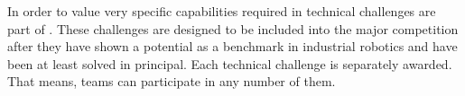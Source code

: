 
In order to value very specific capabilities required in \RCAW technical challenges are part of \RCAW.
These challenges are designed to be included into the major competition after they have shown a potential as a benchmark in industrial robotics and have been at least solved in principal.
Each technical challenge is separately awarded. That means, teams can participate in any number of them.




